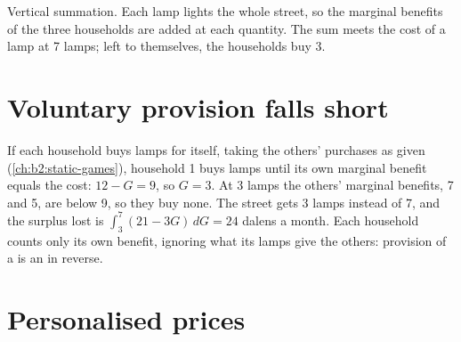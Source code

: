 \begin{omfigure}

{\small Vertical summation. Each lamp lights the whole street, so the marginal benefits of the three households are added
at each quantity. The sum meets the cost of a lamp at 7 lamps; left to themselves, the households buy 3.}
\end{omfigure}

\section{Voluntary provision falls short}\label{sec:b2:externalities-and-public-goods-theory:voluntary}

If each household buys lamps for itself, taking the others' purchases as given (\cref{ch:b2:static-games}), household 1 buys
lamps until its own marginal benefit equals the cost: $12 - G = 9$, so $G = 3$. At 3 lamps the others' marginal benefits, 7 and 5, are
below 9, so they buy none. The street gets 3 lamps instead of 7, and the surplus lost is $\int_3^7 (21 - 3G)\,dG = 24$ dalens a month. Each
household counts only its own benefit, ignoring what its lamps give the others: provision of a  is an
 in reverse.

\section{Personalised prices}\label{sec:b2:externalities-and-public-goods-theory:lindahl}

